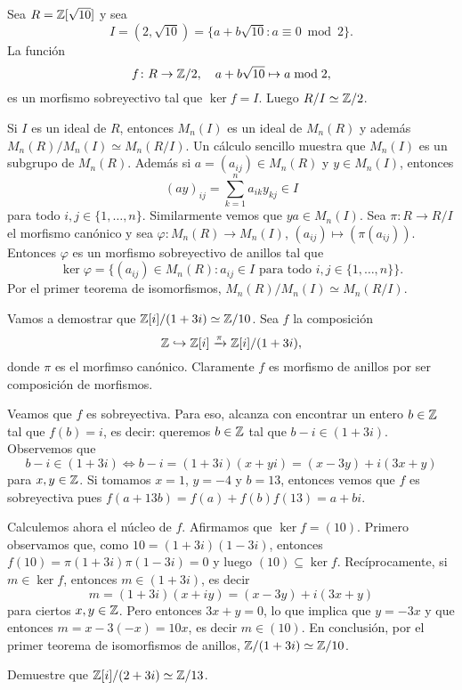\begin{example}
Sea $R=\mathbb{Z}[\sqrt{10}]$ y sea 
\[
I=(2,\sqrt{10})=\{a+b\sqrt{10}:a\equiv 0\bmod 2\}.
\]
La función
\[
f\colon R\to\mathbb{Z}/2,\quad
a+b\sqrt{10}\mapsto a\bmod 2,
\]
es un morfismo sobreyectivo tal que $\ker f=I$. Luego $R/I\simeq\mathbb{Z}/2$. 
\end{example}

\begin{example}
Si $I$ es un ideal de $R$, entonces $M_n(I)$ es un ideal de $M_n(R)$ y además 
$M_n(R)/M_n(I)\simeq M_n(R/I)$. Un cálculo sencillo muestra que
$M_n(I)$ es un subgrupo de $M_n(R)$. 
Además si $a=(a_{ij})\in M_n(R)$ y $y\in M_n(I)$, entonces
\[
(ay)_{ij}=\sum_{k=1}^n a_{ik}y_{kj}\in I
\]
para todo $i,j\in\{1,\dots,n\}$. Similarmente vemos que $ya\in M_n(I)$. Sea $\pi\colon R\to R/I$ el morfismo
canónico y sea $\varphi\colon M_n(R)\to M_n(I)$, $(a_{ij})\mapsto (\pi(a_{ij}))$. Entonces
$\varphi$ es un morfismo sobreyectivo de anillos tal que 
\[
\ker\varphi=\{(a_{ij})\in M_n(R):a_{ij}\in I\text{ para todo $i,j\in\{1,\dots,n\}$}\}. 
\]
Por el primer teorema de isomorfismos, $M_n(R)/M_n(I)\simeq M_n(R/I)$. 
\end{example}

\begin{example}
Vamos a demostrar que $\mathbb{Z}[i]/(1+3i)\simeq\mathbb{Z}/10$. Sea $f$ la composición
\[
\mathbb{Z}\hookrightarrow\mathbb{Z}[i]\xrightarrow{\pi} \mathbb{Z}[i]/(1+3i),
\]
donde $\pi$ es el morfimso canónico. Claramente $f$ es morfismo de anillos por ser composición de morfismos. 

Veamos que $f$ es sobreyectiva. Para eso, alcanza con encontrar un entero $b\in\mathbb{Z}$ tal que $f(b)=i$, es decir: queremos $b\in\mathbb{Z}$ 
tal que $b-i\in (1+3i)$. Observemos que
\[
b-i\in(1+3i)\Longleftrightarrow b-i=(1+3i)(x+yi)=(x-3y)+i(3x+y)
\]
para $x,y\in\mathbb{Z}$. Si tomamos $x=1$, $y=-4$ y $b=13$, entonces vemos que
$f$ es sobreyectiva pues $f(a+13b)=f(a)+f(b)f(13)=a+bi$. 

Calculemos ahora el núcleo de $f$. Afirmamos que $\ker f=(10)$. Primero observamos que, como $10=(1+3i)(1-3i)$, entonces
$f(10)=\pi(1+3i)\pi(1-3i)=0$ y luego $(10)\subseteq\ker f$. Recíprocamente, si $m\in\ker f$, entonces $m\in (1+3i)$, es decir
\[
m=(1+3i)(x+iy)=(x-3y)+i(3x+y)
\]
para ciertos $x,y\in\mathbb{Z}$. Pero entonces $3x+y=0$, lo que implica que $y=-3x$ y que entonces $m=x-3(-x)=10x$, es decir $m\in(10)$. 
En conclusión, por el primer teorema de isomorfismos de anillos, $\mathbb{Z}/(1+3i)\simeq\mathbb{Z}/10$. 
\end{example}

\begin{exercise}
Demuestre que $\mathbb{Z}[i]/(2+3i)\simeq\mathbb{Z}/13$. 
\end{exercise}

